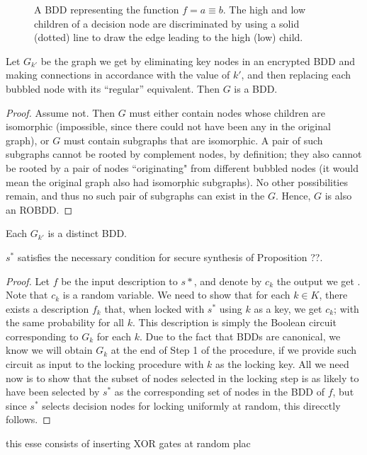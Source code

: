 \begin{figure}[ht]
  \caption{A BDD representing the function $f = a \equiv b$. The high and low children of a decision node are discriminated by using a solid (dotted) line to draw the edge leading to the high (low) child.}
  \label{fig:dummy5}
\end{figure}


\begin{lemma}
Let $G_{k'}$ be the graph we get by eliminating key nodes in an encrypted BDD and making connections in accordance with the value of $k'$, and then replacing each bubbled node with its ``regular'' equivalent. Then $G$ is a BDD.
\end{lemma}

\begin{proof}
Assume not. Then $G$ must either contain nodes whose children are isomorphic (impossible, since there could not have been any in the original graph), or $G$ must contain subgraphs that are isomorphic. A pair of such subgraphs cannot be rooted by complement nodes, by definition; they also cannot be rooted by a pair of nodes ``originating" from different bubbled nodes (it would mean the original graph also had isomorphic subgraphs). No other possibilities remain, and thus no such pair of subgraphs can exist in the $G$. Hence, $G$ is also an ROBDD.
\end{proof}

\begin{lemma}
Each $G_{k'}$ is a distinct BDD.
\end{lemma}

\begin{theorem}
$s^{*}$ satisfies the necessary condition for secure synthesis of Proposition ??.
\end{theorem}

\begin{proof}
Let $f$ be the input description to $s*$, and denote by $c_k$ the output we get . Note that $c_k$ is a random variable. We need to show that for each $k\in K$, there exists a description $f_k$ that, when locked with $s^{*}$ using $k$ as a key, we get $c_k$; with the same probability for all $k$. This description is simply the Boolean circuit corresponding to $G_{k}$ for each $k$. Due to the fact that BDDs are canonical, we know we will obtain $G_{k}$ at the end of Step 1 of the procedure, if we provide such circuit as input to the locking procedure with $k$ as the locking key. All we need now is to show that the subset of nodes selected in the locking step is as likely to have been selected by $s^{*}$ as the corresponding set of nodes in the BDD of $f$, but since $s^{*}$ selects decision nodes for locking uniformly at random, this direcctly follows.
\end{proof}

this esse consists of inserting XOR gates at random plac

